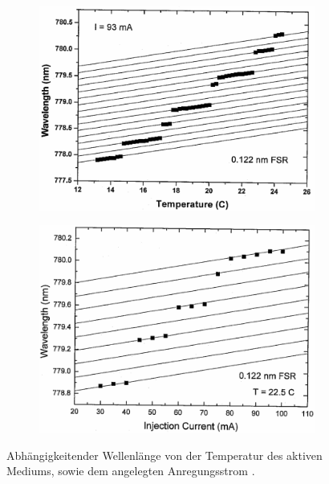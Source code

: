 \begin{figure}[htb]
  \begin{subfigure}[c]{0.5\textwidth}
    \includegraphics[width=\textwidth]{images/temp-lambda.pdf}
    \label{fig:temp_lambda}
  \end{subfigure}
  \begin{subfigure}[c]{0.5\textwidth}
    \includegraphics[width=\textwidth]{images/strom-lambda.pdf}
    \label{fig:strom_lambda}
  \end{subfigure}
  \caption{Abhängigkeitender Wellenlänge von der Temperatur des aktiven Mediums,
  sowie dem angelegten Anregungsstrom \cite{anleitung}.}
\end{figure}

